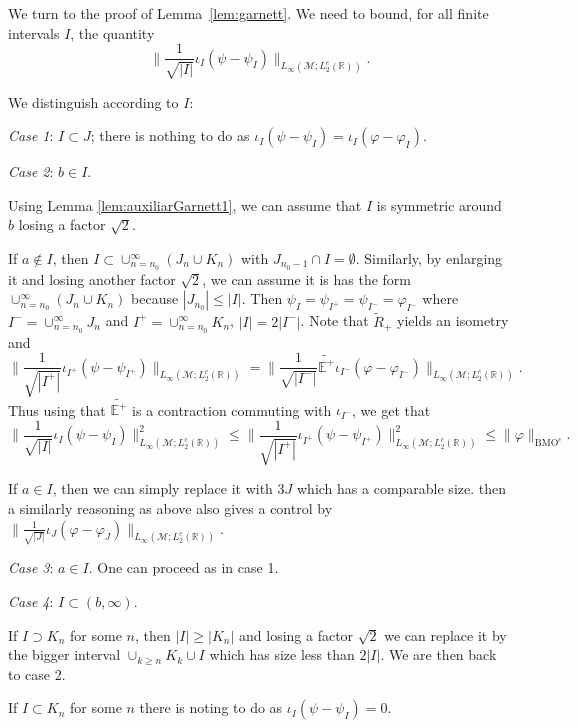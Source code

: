\documentclass[psamsfonts]{amsart}
\newcommand{\Linfty}{L_\infty}
\newcommand{\Ltwoc}{L_2^c}
\newcommand{\BMOc}{\mathrm{BMO}^c}
\begin{document}
    
    We turn to the proof of Lemma~\ref{lem:garnett}. We need to bound, for all finite intervals $I$, the quantity $$\big\| \frac1{\sqrt {|I|}} \iota_I(\psi -\psi_I) \big\|_{\Linfty(\mathcal{M};\Ltwoc(\mathbb{R}))}.$$ 

    We distinguish according to $I$:

    {\it Case 1}: $I\subset J$; there is nothing to do
    as $\iota_{I}(\psi -\psi_{I})=\iota_{I}(\varphi -\varphi_{I})$.
    
    {\it Case 2}: $b\in I$.

    Using Lemma \eqref{lem:auxiliarGarnett1}, we can assume that $I$ is symmetric around $b$ losing a factor $\sqrt 2$.

    If $a\notin I$, then $I\subset \cup_{n=n_0}^\infty(J_n\cup
    K_n)$ with $J_{n_0-1}\cap I=\emptyset$. Similarly, by enlarging it and losing another factor $\sqrt{2}$,     we can assume it is has the form $\cup_{n=n_0}^\infty(J_n\cup  K_n)$ because $|J_{n_0}|\leq |I|$.  Then $\psi_I=\psi_{I^+}=\psi_{I^-}=\varphi_{I^-}$ where $I^-=\cup_{n=n_0}^\infty J_n$ and $I^+=\cup_{n=n_0}^\infty K_n$, $|I|=2|I^-|$. Note that $\widetilde R_+$ yields an isometry and
    $$\| \frac1{\sqrt {|I^+|}} \iota_{I^+}(\psi -\psi_{I^+}) \big\|_{\Linfty(\mathcal{M};\Ltwoc(\mathbb{R}))}=\| \frac1{\sqrt {|I^-|}} \widetilde {\mathbb E^+}\iota_{I^-}(\varphi -\varphi_{I^-}) \big\|_{\Linfty(\mathcal{M};\Ltwoc(\mathbb{R}))}.$$    Thus using that $\widetilde {\mathbb E^+}$ is a contraction commuting with $\iota_{I^-}$, we get that 
    $$\| \frac1{\sqrt {|I|}} \iota_I(\psi -\psi_I) \big\|_{\Linfty(\mathcal{M};\Ltwoc(\mathbb{R}))}^2\leq \| \frac1{\sqrt {|I^+|}} \iota_{I^+}(\psi -\psi_{I^+}) \big\|_{\Linfty(\mathcal{M};\Ltwoc(\mathbb{R}))}^2\leq \|\varphi\|_{\BMOc}.$$

    If $a\in I$, then we can simply replace it with $3J$ which has a comparable size. then a similarly reasoning as above also gives a control by $\| \frac1{\sqrt {|J|}} \iota_{J}(\varphi -\varphi_{J}) \big\|_{\Linfty(\mathcal{M};\Ltwoc(\mathbb{R}))}$.
    
    {\it Case 3}: $a\in I$. One can proceed as in case 1.

    {\it Case 4}: $I\subset (b,\infty)$.

    If $I\supset K_n$ for some $n$, then $|I|\geq |K_n|$ and losing a factor $\sqrt 2$ we can replace it by the bigger interval $\cup_{k\geq n} K_k\cup I$ which has size less than $2|I|$. We are then back to case 2.

    If $I\subset K_n$ for some $n$ there is noting to do as $\iota_I(\psi -\psi_I)=0$.
\end{document}
